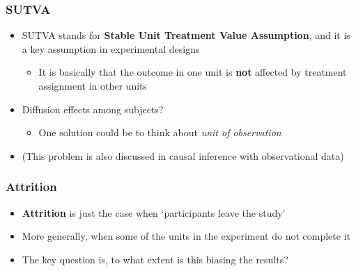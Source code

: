 \documentclass[aspectratio=43]{beamer}
\begin{document}
\begin{frame}
\frametitle{SUTVA}
\centering

\begin{itemize}
  \item SUTVA stands for \textbf{Stable Unit Treatment Value Assumption}, and it is a key assumption in experimental designs
  \begin{itemize}
    \item It is basically that the outcome in one unit is \textbf{not} affected by treatment assignment in other units
  \end{itemize}
  \item Diffusion effects among subjects?
  \begin{itemize}
    \item One solution could be to think about \textit{unit of observation}
  \end{itemize}
  \item (This problem is also discussed in causal inference with observational data)
\end{itemize}

\end{frame}

\begin{frame}
\frametitle{Attrition}
\centering

\begin{itemize}
  \item \textbf{Attrition} is just the case when `participants leave the study'
  \item More generally, when some of the units in the experiment do not complete it
  \item The key question is, to what extent is this biasing the results?
\end{itemize}

\end{frame}
\end{document}
